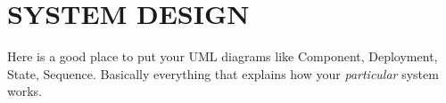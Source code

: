 \chapter{SYSTEM DESIGN}

Here is a good place to put your UML diagrams like 
Component, Deployment, State, Sequence.
Basically everything that explains how your \textit{particular} system works.